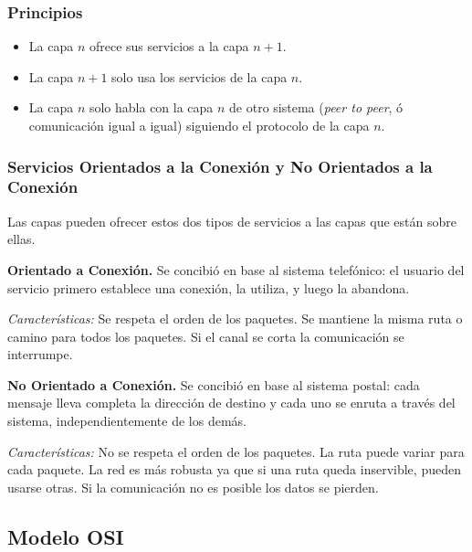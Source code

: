 \documentclass[10pt,a4paper]{article}
\begin{document}
\subsubsection{Principios}
\begin{itemize}
\item La capa $n$ ofrece sus servicios a la capa $n+1$.
\item La capa $n+1$ solo usa los servicios de la capa $n$.
\item La capa $n$ solo habla con la capa $n$ de otro sistema (\textit{peer to peer}, ó comunicación igual a igual) siguiendo el protocolo de la capa $n$.
\end{itemize}

\subsubsection{Servicios Orientados a la Conexión y No Orientados a la Conexión}

Las capas pueden ofrecer estos dos tipos de servicios a las capas que están sobre ellas.
\begin{description}
\item \textbf{Orientado a Conexión.} Se concibió en base al sistema telefónico: el usuario del servicio primero establece una conexión, la utiliza, y luego la abandona.

\textit{Características:} Se respeta el orden de los paquetes. Se mantiene la misma ruta o camino para todos los paquetes. Si el canal se corta la comunicación se interrumpe.
\item \textbf{No Orientado a Conexión.} Se concibió en base al sistema postal: cada mensaje lleva completa la dirección de destino y cada uno se enruta a través del sistema, independientemente de los demás.

\textit{Características:} No se respeta el orden de los paquetes. La ruta puede variar para cada paquete. La red es más robusta ya que si una ruta queda inservible, pueden usarse otras. Si la comunicación  no es posible los datos se pierden.
\end{description}

\subsection{Modelo OSI}
\end{document}
